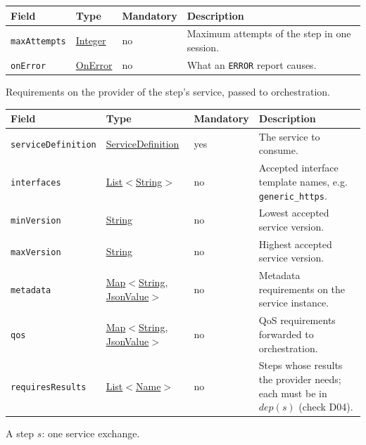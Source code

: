 \documentclass[a4paper]{arrowhead}
\newcommand{\mref}[1]{{\textcolor{ArrowheadPurple}{\hyperref[sec:model:#1]{#1}}}}
\newcommand{\pref}[1]{{\textcolor{ArrowheadGrey}{\hyperref[sec:model:primitives:#1]{#1}}}}
\begin{document}
{\small
\begin{longtable}{|p{3.7cm}|p{4.2cm}|p{1.6cm}|p{6.3cm}|}

\hline
\rowcolor{gray!33} Field & Type & Mandatory & Description \\ \hline
\endhead
\texttt{maxAttempts} & \pref{Integer} & no & Maximum attempts of the step in one session. \\ \hline
\texttt{onError} & \mref{OnError} & no & What an \texttt{ERROR} report causes. \\ \hline
\end{longtable}
}

Requirements on the provider of the step's service, passed to orchestration.

{\small
\begin{longtable}{|p{3.7cm}|p{4.2cm}|p{1.6cm}|p{6.3cm}|}

\hline
\rowcolor{gray!33} Field & Type & Mandatory & Description \\ \hline
\endhead
\texttt{serviceDefinition} & \pref{ServiceDefinition} & yes & The service to consume. \\ \hline
\texttt{interfaces} & \pref{List}$<$\pref{String}$>$ & no & Accepted interface template names, e.g. \texttt{generic\_https}. \\ \hline
\texttt{minVersion} & \pref{String} & no & Lowest accepted service version. \\ \hline
\texttt{maxVersion} & \pref{String} & no & Highest accepted service version. \\ \hline
\texttt{metadata} & \pref{Map}$<$\pref{String}, \pref{JsonValue}$>$ & no & Metadata requirements on the service instance. \\ \hline
\texttt{qos} & \pref{Map}$<$\pref{String}, \pref{JsonValue}$>$ & no & QoS requirements forwarded to orchestration. \\ \hline
\texttt{requiresResults} & \pref{List}$<$\pref{Name}$>$ & no & Steps whose results the provider needs; each must be in $dep(s)$ (check D04). \\ \hline
\end{longtable}
}

A step $s$: one service exchange.
\end{document}
